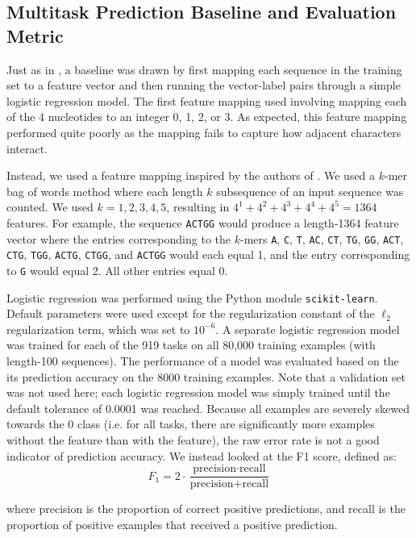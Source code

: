 \documentclass{article} %
\begin{document}
\subsection{Multitask Prediction Baseline and Evaluation Metric}

Just as in \cite{quang2015danq}, a baseline was drawn by first mapping each sequence in the training set to a feature vector and then running the vector-label pairs through a simple logistic regression model. The first feature mapping used involving mapping each of the 4 nucleotides to an integer 0, 1, 2, or 3. As expected, this feature mapping performed quite poorly as the mapping fails to capture how adjacent characters interact.

Instead, we used a feature mapping inspired by the authors of \cite{quang2015danq}. We used a $k$-mer bag of words method where each length $k$ subsequence of an input sequence was counted. We used $k = 1, 2, 3, 4, 5$, resulting in $4^1 + 4^2+4^3+4^4+4^5 = 1364$ features. For example, the sequence \texttt{ACTGG} would produce a length-1364 feature vector where the entries corresponding to the $k$-mers \texttt{A}, \texttt{C}, \texttt{T}, \texttt{AC}, \texttt{CT}, \texttt{TG}, \texttt{GG}, \texttt{ACT}, \texttt{CTG}, \texttt{TGG}, \texttt{ACTG}, \texttt{CTGG}, and \texttt{ACTGG} would each equal 1, and the entry corresponding to \texttt{G} would equal 2. All other entries equal 0.

Logistic regression was performed using the Python module \texttt{scikit-learn}. Default parameters were used except for the regularization constant of the $\ell_2$ regularization term, which was set to $10^{-6}$. A separate logistic regression model was trained for each of the 919 tasks on all 80,000 training examples (with length-100 sequences). The performance of a model was evaluated based on the its prediction accuracy on the 8000 training examples. Note that a validation set was not used here; each logistic regression model was simply trained until the default tolerance of 0.0001 was reached. Because all examples are severely skewed towards the 0 class (i.e. for all tasks, there are significantly more examples without the feature than with the feature), the raw error rate is not a good indicator of prediction accuracy. We instead looked at the F1 score, defined as:
$$ F_1 = 2 \cdot \frac{\mbox{precision} \cdot \mbox{recall} }{\mbox{precision} + \mbox{recall}} $$

where precision is the proportion of correct positive predictions, and recall is the proportion of positive examples that received a positive prediction. 
\end{document}
